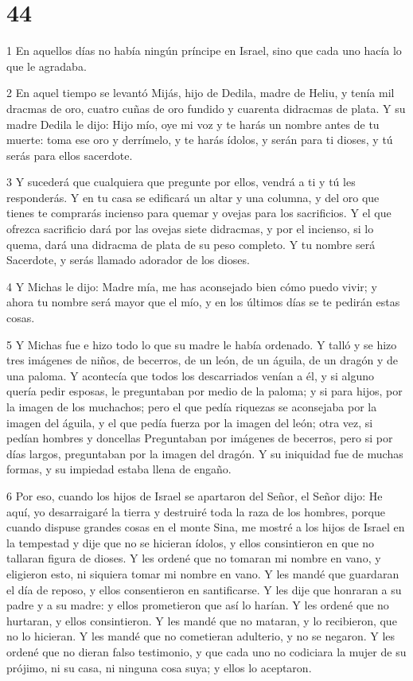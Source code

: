 \chapter{44}

\par 1 En aquellos días no había ningún príncipe en Israel, sino que cada uno hacía lo que le agradaba.

\par 2 En aquel tiempo se levantó Mijás, hijo de Dedila, madre de Heliu, y tenía mil dracmas de oro, cuatro cuñas de oro fundido y cuarenta didracmas de plata. Y su madre Dedila le dijo: Hijo mío, oye mi voz y te harás un nombre antes de tu muerte: toma ese oro y derrímelo, y te harás ídolos, y serán para ti dioses, y tú serás para ellos sacerdote.

\par 3 Y sucederá que cualquiera que pregunte por ellos, vendrá a ti y tú les responderás. Y en tu casa se edificará un altar y una columna, y del oro que tienes te comprarás incienso para quemar y ovejas para los sacrificios. Y el que ofrezca sacrificio dará por las ovejas siete didracmas, y por el incienso, si lo quema, dará una didracma de plata de su peso completo. Y tu nombre será Sacerdote, y serás llamado adorador de los dioses.

\par 4 Y Michas le dijo: Madre mía, me has aconsejado bien cómo puedo vivir; y ahora tu nombre será mayor que el mío, y en los últimos días se te pedirán estas cosas.

\par 5 Y Michas fue e hizo todo lo que su madre le había ordenado. Y talló y se hizo tres imágenes de niños, de becerros, de un león, de un águila, de un dragón y de una paloma. Y acontecía que todos los descarriados venían a él, y si alguno quería pedir esposas, le preguntaban por medio de la paloma; y si para hijos, por la imagen de los muchachos; pero el que pedía riquezas se aconsejaba por la imagen del águila, y el que pedía fuerza por la imagen del león; otra vez, si pedían hombres y doncellas Preguntaban por imágenes de becerros, pero si por días largos, preguntaban por la imagen del dragón. Y su iniquidad fue de muchas formas, y su impiedad estaba llena de engaño.

\par 6 Por eso, cuando los hijos de Israel se apartaron del Señor, el Señor dijo: He aquí, yo desarraigaré la tierra y destruiré toda la raza de los hombres, porque cuando dispuse grandes cosas en el monte Sina, me mostré a los hijos de Israel en la tempestad y dije que no se hicieran ídolos, y ellos consintieron en que no tallaran figura de dioses. Y les ordené que no tomaran mi nombre en vano, y eligieron esto, ni siquiera tomar mi nombre en vano. Y les mandé que guardaran el día de reposo, y ellos consentieron en santificarse. Y les dije que honraran a su padre y a su madre: y ellos prometieron que así lo harían. Y les ordené que no hurtaran, y ellos consintieron. Y les mandé que no mataran, y lo recibieron, que no lo hicieran. Y les mandé que no cometieran adulterio, y no se negaron. Y les ordené que no dieran falso testimonio, y que cada uno no codiciara la mujer de su prójimo, ni su casa, ni ninguna cosa suya; y ellos lo aceptaron.

